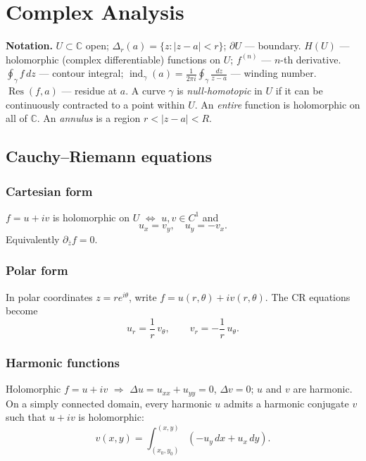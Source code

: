 \chapter{Complex Analysis}
\label{ch:complex}

\medskip

\textbf{Notation.} $U\subset\mathbb{C}$ open; $\Delta_r(a)=\{z:|z-a|<r\}$; $\partial U$ --- boundary.
$H(U)$ --- holomorphic (complex differentiable) functions on $U$; $f^{(n)}$ --- $n$-th derivative.
$\oint_\gamma f\,dz$ --- contour integral; $\operatorname{ind}_\gamma(a)=\frac1{2\pi i}\oint_\gamma\frac{dz}{z-a}$ --- winding number.
$\operatorname{Res}(f,a)$ --- residue at $a$.
A curve $\gamma$ is \textit{null-homotopic} in $U$ if it can be continuously contracted to a point within $U$.
An \textit{entire} function is holomorphic on all of $\mathbb{C}$.
An \textit{annulus} is a region $r<|z-a|<R$.

\medskip

\section{Cauchy--Riemann equations}
\label{sec:cauchy-riemann}

\subsection{Cartesian form}
\label{subsec:cr-cartesian}

$f=u+iv$ is holomorphic on $U$ $\iff$ $u,v\in C^1$ and
$$u_x=v_y,\quad u_y=-v_x.$$
Equivalently $\partial_{\overline z}f=0$.

\medskip

\subsection{Polar form}
\label{subsec:cr-polar}

In polar coordinates $z=re^{i\theta}$, write $f=u(r,\theta)+iv(r,\theta)$. The CR equations become
$$u_r=\frac1r\,v_\theta,\qquad v_r=-\frac1r\,u_\theta.$$

\medskip

\subsection{Harmonic functions}
\label{subsec:harmonic}

Holomorphic $f=u+iv$ $\Rightarrow$ $\Delta u=u_{xx}+u_{yy}=0$, $\Delta v=0$; $u$ and $v$ are harmonic. On a simply connected domain, every harmonic $u$ admits a harmonic conjugate $v$ such that $u+iv$ is holomorphic:
$$v(x,y)=\int_{(x_0,y_0)}^{(x,y)} (-u_y\,dx+u_x\,dy).$$

